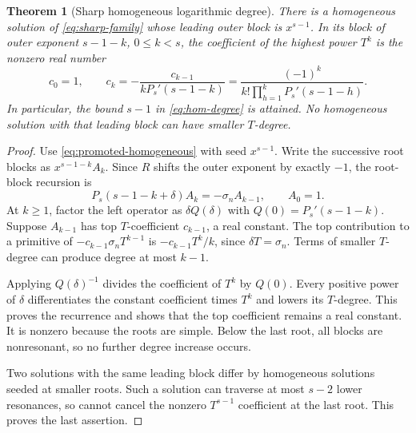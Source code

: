 \documentclass[11pt,a4paper]{article}
\numberwithin{equation}{section}
\newtheorem{theorem}{Theorem}[section]
\theoremstyle{definition}
\theoremstyle{remark}
\begin{document}
\begin{theorem}[Sharp homogeneous logarithmic degree]
\label{thm:sharp-degree}
There is a homogeneous solution of \eqref{eq:sharp-family} whose leading outer block is $x^{s-1}$. In its block of outer exponent $s-1-k$, $0\le k<s$, the coefficient of the highest power $T^k$ is the nonzero real number
\begin{equation}
 c_0=1,\qquad
 c_k=-\frac{c_{k-1}}{kP_s'(s-1-k)}
 =\frac{(-1)^k}{k!\prod_{h=1}^k P_s'(s-1-h)}.
 \label{eq:sharp-coefficients}
\end{equation}
In particular, the bound $s-1$ in \eqref{eq:hom-degree} is attained. No homogeneous solution with that leading block can have smaller $T$-degree.
\end{theorem}
\begin{proof}
Use \eqref{eq:promoted-homogeneous} with seed $x^{s-1}$. Write the successive root blocks as $x^{s-1-k}A_k$. Since $R$ shifts the outer exponent by exactly $-1$, the root-block recursion is
\begin{equation}
 P_s(s-1-k+\delta)A_k=-\sigma_n A_{k-1},\qquad A_0=1.
 \label{eq:sharp-recursion}
\end{equation}
At $k\ge1$, factor the left operator as $\delta Q(\delta)$ with $Q(0)=P_s'(s-1-k)$. Suppose $A_{k-1}$ has top $T$-coefficient $c_{k-1}$, a real constant. The top contribution to a primitive of $-c_{k-1}\sigma_nT^{k-1}$ is $-c_{k-1}T^k/k$, since $\delta T=\sigma_n$. Terms of smaller $T$-degree can produce degree at most $k-1$.

Applying $Q(\delta)^{-1}$ divides the coefficient of $T^k$ by $Q(0)$. Every positive power of $\delta$ differentiates the constant coefficient times $T^k$ and lowers its $T$-degree. This proves the recurrence and shows that the top coefficient remains a real constant. It is nonzero because the roots are simple. Below the last root, all blocks are nonresonant, so no further degree increase occurs.

Two solutions with the same leading block differ by homogeneous solutions seeded at smaller roots. Such a solution can traverse at most $s-2$ lower resonances, so cannot cancel the nonzero $T^{s-1}$ coefficient at the last root. This proves the last assertion.
\end{proof}
\end{document}
